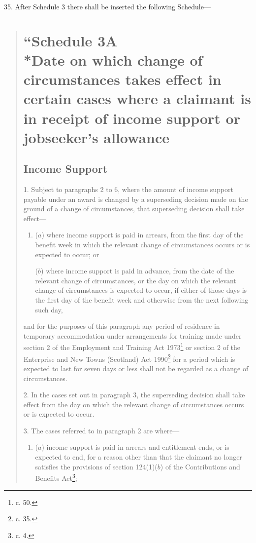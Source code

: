 \documentclass[12pt,a4paper]{article}
\begin{document}
\medskip

35.  After Schedule 3 there shall be inserted the following Schedule—
\begin{quotation}
\section*{\sloppy\noindent ``Schedule 3A\\*Date on which change of circumstances takes effect in certain cases where a claimant is in receipt of income support or jobseeker’s allowance}

\subsection*{Income Support}

1.  Subject to paragraphs 2 to 6, where the amount of income support payable under an award is changed by a superseding decision made on the ground of a change of circumstances, that superseding decision shall take effect—
\begin{enumerate}\item[]
($a$) where income support is paid in arrears, from the first day of the benefit week in which the relevant change of circumstances occurs or is expected to occur; or

($b$) where income support is paid in advance, from the date of the relevant change of circumstances, or the day on which the relevant change of circumstances is expected to occur, if either of those days is the first day of the benefit week and otherwise from the next following such day,
\end{enumerate}
and for the purposes of this paragraph any period of residence in temporary accommodation under arrangements for training made under section 2 of the Employment and Training Act 1973\footnote{ c. 50.} or section 2 of the Enterprise and New Towns (Scotland) Act 1990\footnote{ c. 35.} for a period which is expected to last for seven days or less shall not be regarded as a change of circumstances.

\medskip

2.  In the cases set out in paragraph 3, the superseding decision shall take effect from the day on which the relevant change of circumstances occurs or is expected to occur.

\medskip

3.  The cases referred to in paragraph 2 are where—
\begin{enumerate}\item[]
($a$) income support is paid in arrears and entitlement ends, or is expected to end, for a reason other than that the claimant no longer satisfies the provisions of section 124(1)($b$)  of the Contributions and Benefits Act\footnote{ c. 4.};


\end{enumerate}
\end{quotation}
\end{document}
